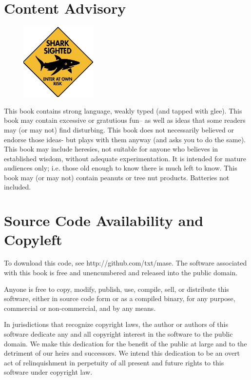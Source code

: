 \documentclass[9pt,twocolumn]{article}
\begin{document}
\section*{Content Advisory }
\begin{figure}
  \includegraphics[width=1.5in]{img/shark.jpg}
  \end{figure}
This book contains strong language, weakly typed (and tapped with glee).
This book may contain excessive or gratutious fun--
as well as ideas that some readers may (or may not) find disturbing.
This book does not necessarily 
believed or endorse those ideas- but plays with them anyway
(and asks you to do the same).
This book may include heresies, not suitable for anyone  who believes in established wisdom, without
adequate experimentation. It is
intended for mature audiences only; i.e.  those
old enough to know there is much left to know. 
This book may (or may not) contain peanuts or tree nut products.
Batteries not included.

\newpage

\section*{Source Code Availability and Copyleft}
To download this code, see http://github.com/txt/mase.
The software associated with this book
is free and unencumbered and released into the public domain. 

Anyone is free to copy, modify, publish, use, compile, sell, or
distribute this software, either in source code form or as a compiled
binary, for any purpose, commercial or non-commercial, and by any
means.

In jurisdictions that recognize copyright laws, the author or authors
of this software dedicate any and all copyright interest in the
software to the public domain. We make this dedication for the benefit
of the public at large and to the detriment of our heirs and
successors. We intend this dedication to be an overt act of
relinquishment in perpetuity of all present and future rights to this
software under copyright law.
\end{document}
